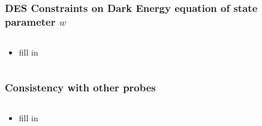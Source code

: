 \documentclass{beamer}
\begin{document}
\frame
{
    \frametitle{DES Constraints on Dark Energy equation of state parameter $w$}


    \begin{columns}
        \begin{column}{0.5\textwidth}    
            \begin{itemize}

                \item fill in

            \end{itemize}
        \end{column}
        \begin{column}{0.5\textwidth}
        \end{column}
    \end{columns}

}

\frame
{
    \frametitle{Consistency with other probes}


    \begin{columns}
        \begin{column}{0.5\textwidth}    
            \begin{itemize}

                \item fill in

            \end{itemize}
        \end{column}
        \begin{column}{0.5\textwidth}
        \end{column}
    \end{columns}

}
\end{document}
